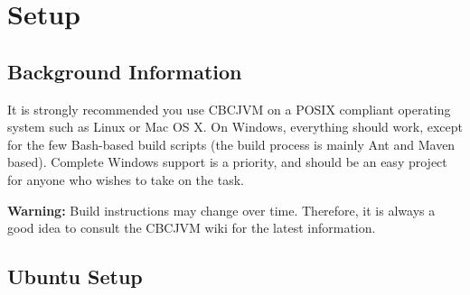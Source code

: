 \documentclass[12pt,letterpaper]{article}
\begin{document}
\pagebreak
\section{Setup}

\subsection{Background Information}

It is strongly recommended you use CBCJVM on a POSIX compliant operating system such as Linux or Mac OS X. On Windows, everything should work, except for the few Bash-based build scripts (the build process is mainly Ant and Maven based). Complete Windows support is a priority, and should be an easy project for anyone who wishes to take on the task.

\textbf{Warning:} Build instructions may change over time. Therefore, it is always a good idea to consult the CBCJVM wiki for the latest information.

\subsection{Ubuntu Setup}
\end{document}
